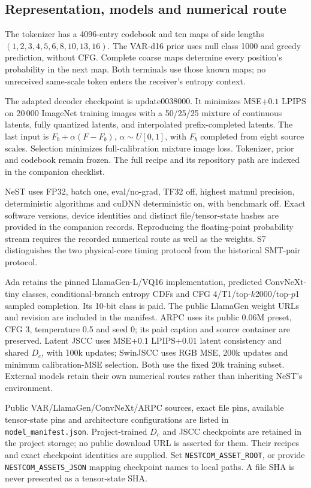 \documentclass[10pt,letterpaper]{article}
\begin{document}
\subsection{Representation, models and numerical route}
The tokenizer has a 4096-entry codebook and ten maps of side lengths $(1,2,3,4,5,6,8,10,13,16)$. The VAR-d16 prior uses null class 1000 and greedy prediction, without CFG. Complete coarse maps determine every position's probability in the next map. Both terminals use those known maps; no unreceived same-scale token enters the receiver's entropy context.

The adapted decoder checkpoint is update0038000. It minimizes MSE+$0.1$ LPIPS on 20\,000 ImageNet training images with a 50/25/25 mixture of continuous latents, fully quantized latents, and interpolated prefix-completed latents. The last input is $F_b+\alpha(F-F_b)$, $\alpha\sim U[0,1]$, with $F_b$ completed from eight source scales. Selection minimizes full-calibration mixture image loss. Tokenizer, prior and codebook remain frozen. The full recipe and its repository path are indexed in the companion checklist.

NeST uses FP32, batch one, eval/no-grad, TF32 off, highest matmul precision, deterministic algorithms and cuDNN deterministic on, with benchmark off. Exact software versions, device identities and distinct file/tensor-state hashes are provided in the companion records. Reproducing the floating-point probability stream requires the recorded numerical route as well as the weights. S7 distinguishes the two physical-core timing protocol from the historical SMT-pair protocol.

Ada retains the pinned LlamaGen-L/VQ16 implementation, predicted ConvNeXt-tiny classes, conditional-branch entropy CDFs and CFG 4/T1/top-$k$2000/top-$p$1 sampled completion. Its 10-bit class is paid. The public LlamaGen weight URLs and revision are included in the manifest. ARPC uses its public 0.06M preset, CFG 3, temperature 0.5 and seed 0; its paid caption and source container are preserved. Latent JSCC uses MSE+$0.1$ LPIPS+$0.01$ latent consistency and shared $D_c$, with 100k updates; SwinJSCC uses RGB MSE, 200k updates and minimum calibration-MSE selection. Both use the fixed 20k training subset. External models retain their own numerical routes rather than inheriting NeST's environment.

Public VAR/LlamaGen/ConvNeXt/ARPC sources, exact file pins, available tensor-state pins and architecture configurations are listed in \texttt{model\_manifest.json}. Project-trained $D_c$ and JSCC checkpoints are retained in the project storage; no public download URL is asserted for them. Their recipes and exact checkpoint identities are supplied. Set \texttt{NESTCOM\_ASSET\_ROOT}, or provide \texttt{NESTCOM\_ASSETS\_JSON} mapping checkpoint names to local paths. A file SHA is never presented as a tensor-state SHA.
\end{document}

